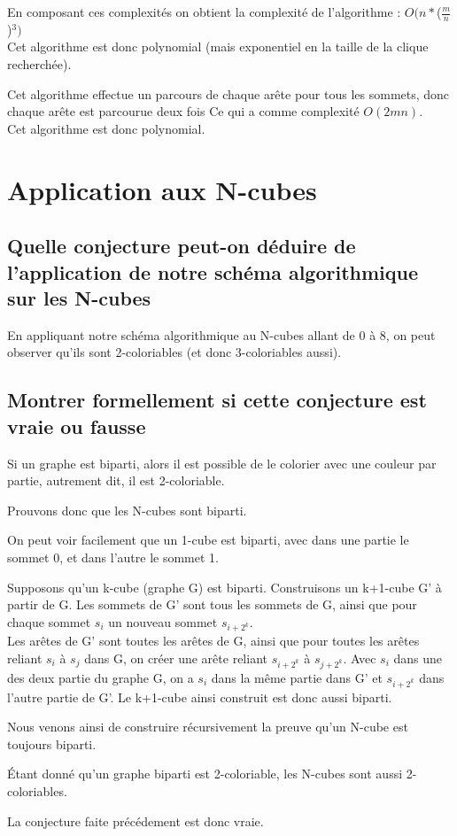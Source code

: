 \documentclass[a4paper, 11pt]{article}
\begin{document}
    En composant ces complexités on obtient la complexité de l'algorithme : $O(n*$($\frac{m}{n}$)$^3)$\\
    Cet algorithme est donc polynomial (mais exponentiel en la taille de la clique recherchée).

    \label{subsubsec:Q3E3}
    Cet algorithme effectue un parcours de chaque arête pour tous les sommets, donc chaque arête est parcourue deux fois
    Ce qui a comme complexité $O(2mn)$.\\
    Cet algorithme est donc polynomial.

    \section{Application aux N-cubes}\label{sec:application-aux-n-cubes}

    \subsection{Quelle conjecture peut-on déduire de l'application de notre schéma algorithmique sur les N-cubes}\label{subsec:Q4C}
    En appliquant notre schéma algorithmique au N-cubes allant de 0 à 8, on peut observer qu'ils sont 2-coloriables (et donc 3-coloriables aussi).

    \subsection{Montrer formellement si cette conjecture est vraie ou fausse}\label{subsec:Q4D}
    Si un graphe est biparti, alors il est possible de le colorier avec une couleur par partie, autrement dit, il est 2-coloriable.

    Prouvons donc que les N-cubes sont biparti.

    On peut voir facilement que un 1-cube est biparti, avec dans une partie le sommet 0, et dans l'autre le sommet 1.

    Supposons qu'un k-cube (graphe G) est biparti.
    Construisons un k+1-cube G' à partir de G.
    Les sommets de G' sont tous les sommets de G, ainsi que pour chaque sommet $s_i$ un nouveau sommet $s_{i+2^k}$.\\
    Les arêtes de G' sont toutes les arêtes de G,
    ainsi que pour toutes les arêtes reliant $s_i$ à $s_j$ dans G, on créer une arête reliant $s_{i+2^k}$ à $s_{j+2^k}$.
    Avec $s_i$ dans une des deux partie du graphe G,
    on a $s_i$ dans la même partie dans G' et $s_{i+2^k}$ dans l'autre partie de G'.
    Le k+1-cube ainsi construit est donc aussi biparti.

    Nous venons ainsi de construire récursivement la preuve qu'un N-cube est toujours biparti.

    Étant donné qu'un graphe biparti est 2-coloriable, les N-cubes sont aussi 2-coloriables.

    La conjecture faite précédement est donc vraie.
\end{document}
